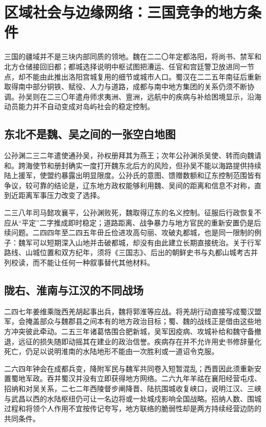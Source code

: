 \section{区域社会与边缘网络：三国竞争的地方条件}
\label{sec:three-kingdoms-regional-society-frontiers}

三国的疆域并不是三块内部同质的领地。魏在二二〇年定都洛阳，将尚书、禁军和北方仓储接回旧都；都城选择说明中枢试图把漕运、任官和宫廷警卫放进同一节点，却不能由此推出洛阳宫城复用的细节或城市人口。蜀汉在二二五年南征后重新取得南中部分铜铁、赋役、人力与道路，成都与南中地方集团的关系仍须不断协调。孙吴则在二三〇年遣舟师求夷洲、亶洲，远航中的疾病与补给困境显示，沿海动员能力并不自动变成对岛屿社会的稳定控制。

\subsection{东北不是魏、吴之间的一张空白地图}

公孙渊二三二年遣使通孙吴，孙权册拜其为燕王；次年公孙渊杀吴使、转而向魏请和。跨海使节和册封确实一度打开魏东北后方的风险，但孙吴不能以海路提供持续陆上援军，使盟约暴露出明显限度。公孙氏的意图、馈赠数额和辽东控制范围皆有争议，较可靠的结论是，辽东地方政权能够利用魏、吴间的距离和信息不对称，直到近距离军事压力改变了选择。

二三八年司马懿攻襄平，公孙渊败死，魏取得辽东的名义控制。征服后行政恢复不应从“平定”二字推成即时稳定；道路距离、战争暴力与地方官民的重新安置仍是后续问题。二四四年至二四五年毌丘俭进攻高句丽、攻破丸都城，也是同一限制的例子：魏军可以短期深入山地并击破都城，却没有由此建立长期直接统治。关于行军路线、山城位置和双方纪年，须将《三国志》、后出的朝鲜史书与丸都山城考古并列校读，而不能让任何一种叙事替代其他材料。

\subsection{陇右、淮南与江汉的不同战场}

二四七年姜维乘陇西羌胡起事出兵，魏将郭淮等应战。将羌胡行动直接写成蜀汉盟军，会掩盖部众与魏郡县之间本有的地方政治目标；蜀、魏的战线正是借由这些地方冲突彼此牵动。二五三年诸葛恪围合肥新城，吴军因疫病、攻城补给和魏守备撤退，远征的损失随即动摇其在建业的政治信誉。疾病存在并不允许用史书修辞量化死亡，仍足以说明淮南的水陆地形不能由一次胜利或一道诏令克服。

二六四年钟会在成都兵变，降附军民与魏军共同卷入短暂混乱；西晋因此须重新安置蜀地军政。吞并蜀汉并没有立即获得地方网络。二六九年羊祜在襄阳经营屯戍、招纳和对吴关系，二七二年西陵督步阐降晋、陆抗围城收复峡口，说明江汉、三峡与武昌以西的水陆枢纽仍可让一名边将或一处城戍影响全国战略。招纳人数、围城过程和将领个人作用不宜按传记夸写，地方联络的脆弱性却是两方持续经营边防的共同条件。

